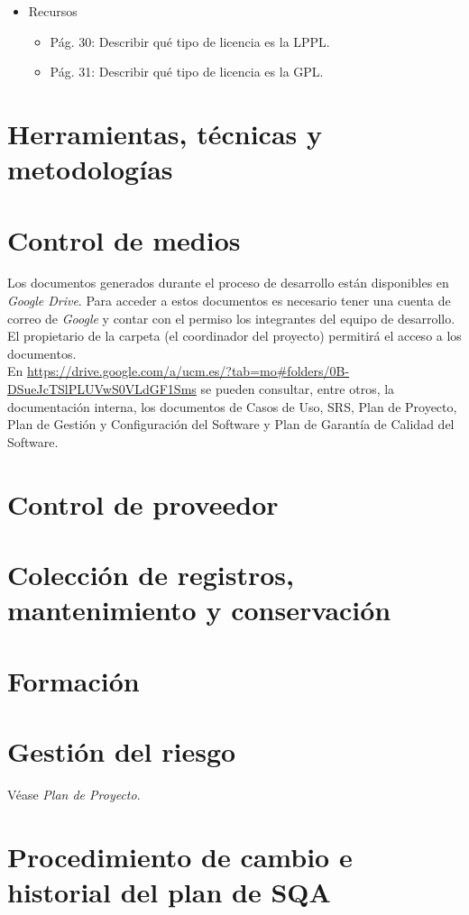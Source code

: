 \documentclass[11pt, a4paper, twoside, titlepage]{article}
\begin{document}
\begin{itemize}
\begin{itemize}
\begin{itemize}
							\item Recursos
								\begin{itemize}
								\item Pág.  30:  Describir  qué  tipo  de  licencia  es  la  LPPL.   
								\item Pág.  31:  Describir  qué  tipo  de  licencia  es  la  GPL.  
								\end{itemize}
						\end{itemize}
				\end{itemize}
		\end{itemize}	
	\section{Herramientas, técnicas y metodologías}%
	\section{Control de medios}%
		Los documentos generados durante el proceso de desarrollo están disponibles en \textit{Google Drive}. Para acceder a estos documentos es necesario tener una cuenta de correo de \textit{Google} y contar con el permiso los integrantes del equipo de desarrollo. El propietario de la carpeta (el coordinador del proyecto) permitirá el acceso a los documentos. \\
		En \url{https://drive.google.com/a/ucm.es/?tab=mo#folders/0B-DSueJcTSlPLUVwS0VLdGF1Sms} se pueden consultar, entre otros, la documentación interna, los documentos de Casos de Uso, SRS, Plan de Proyecto, Plan de Gestión y Configuración del Software y Plan de Garantía de Calidad del Software.

	\section{Control de proveedor}%
	\section{Colección de registros, mantenimiento y conservación}%





	\section{Formación}%
	\section{Gestión del riesgo}
		Véase \textit{Plan de Proyecto}.
		\printglossaries
	\section{Procedimiento de cambio e historial del plan de SQA}%


	\newpage
	
	
\end{document}
